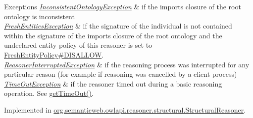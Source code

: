 \begin{DoxyExceptions}{Exceptions}
{\em \hyperlink{classorg_1_1semanticweb_1_1owlapi_1_1reasoner_1_1_inconsistent_ontology_exception}{Inconsistent\-Ontology\-Exception}} & if the imports closure of the root ontology is inconsistent \\
\hline
{\em \hyperlink{classorg_1_1semanticweb_1_1owlapi_1_1reasoner_1_1_fresh_entities_exception}{Fresh\-Entities\-Exception}} & if the signature of the individual is not contained within the signature of the imports closure of the root ontology and the undeclared entity policy of this reasoner is set to \hyperlink{enumorg_1_1semanticweb_1_1owlapi_1_1reasoner_1_1_fresh_entity_policy_a762eae6d5b2449d125311ecaabfdc8d0}{Fresh\-Entity\-Policy\#\-D\-I\-S\-A\-L\-L\-O\-W}. \\
\hline
{\em \hyperlink{classorg_1_1semanticweb_1_1owlapi_1_1reasoner_1_1_reasoner_interrupted_exception}{Reasoner\-Interrupted\-Exception}} & if the reasoning process was interrupted for any particular reason (for example if reasoning was cancelled by a client process) \\
\hline
{\em \hyperlink{classorg_1_1semanticweb_1_1owlapi_1_1reasoner_1_1_time_out_exception}{Time\-Out\-Exception}} & if the reasoner timed out during a basic reasoning operation. See \hyperlink{interfaceorg_1_1semanticweb_1_1owlapi_1_1reasoner_1_1_o_w_l_reasoner_a44b2c968f989afe5290db29c90faa164}{get\-Time\-Out()}. \\
\hline
\end{DoxyExceptions}


Implemented in \hyperlink{classorg_1_1semanticweb_1_1owlapi_1_1reasoner_1_1structural_1_1_structural_reasoner_a8c8c022c4b0ce3c6e1e90abaf0cdbb3e}{org.\-semanticweb.\-owlapi.\-reasoner.\-structural.\-Structural\-Reasoner}.

